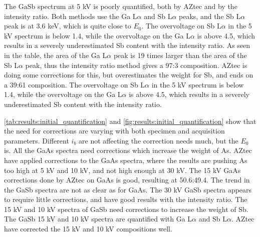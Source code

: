 The GaSb spectrum at 5 kV is poorly quantified, both by AZtec and by the intensity ratio.
Both methods use the Ga L$\alpha$ and Sb L$\alpha$ peaks, and the Sb L$\alpha$ peak is at 3.6 keV, which is quite close to $E_0$.
The overvoltage on Sb L$\alpha$ in the 5 kV spectrum is below 1.4, while the overvoltage on the Ga L$\alpha$ is above 4.5, which results in a severely underestimated Sb content with the intensity ratio.
As seen in the table, the area of the Ga L$\alpha$ peak is 19 times larger than the area of the Sb L$\alpha$ peak, thus the intensity ratio method gives a 97:3 composition.
AZtec is doing some corrections for this, but overestimates the weight for Sb, and ends on a 39:61 composition.
The overvoltage on Sb L$\alpha$ in the 5 kV spectrum is below 1.4, while the overvoltage on the Ga L$\alpha$ is above 4.5, which results in a severely underestimated Sb content with the intensity ratio.




\cref{tab:results:initial_quantification} and \cref{fig:results:initial_quantification} show that the need for corrections are varying with both specimen and acquisition parameters.
Different $i_b$ are not affecting the correction needs much, but the $E_0$ is.
All the GaAs spectra need corrections which increase the weight of As.
AZtec have applied corrections to the GaAs spectra, where the results are pushing As too high at 5 kV and 10 kV, and not high enough at 30 kV.
The 15 kV GaAs corrections done by AZtec on GaAs is good, resulting at 50.6:49.4.
The trend in the GaSb spectra are not as clear as for GaAs.
The 30 kV GaSb spectra appears to require little corrections, and have good results with the intensity ratio.
The 15 kV and 10 kV spectra of GaSb need corrections to increase the weight of Sb.
The GaSb 15 kV and 10 kV spectra are quantified with Ga L$\alpha$ and Sb L$\alpha$.
AZtec have corrected the 15 kV and 10 kV compositions well.


